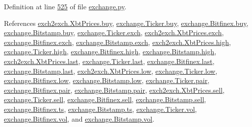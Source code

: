 Definition at line \hyperlink{exchange_8py_source_l00525}{525} of file \hyperlink{exchange_8py_source}{exchange.\+py}.



References \hyperlink{exch2exch_8py_source_l00059}{exch2exch.\+Xbt\+Prices.\+buy}, \hyperlink{exchange_8py_source_l00060}{exchange.\+Ticker.\+buy}, \hyperlink{exchange_8py_source_l00430}{exchange.\+Bitfinex.\+buy}, \hyperlink{exchange_8py_source_l00502}{exchange.\+Bitstamp.\+buy}, \hyperlink{exchange_8py_source_l00057}{exchange.\+Ticker.\+exch}, \hyperlink{exch2exch_8py_source_l00064}{exch2exch.\+Xbt\+Prices.\+exch}, \hyperlink{exchange_8py_source_l00424}{exchange.\+Bitfinex.\+exch}, \hyperlink{exchange_8py_source_l00499}{exchange.\+Bitstamp.\+exch}, \hyperlink{exch2exch_8py_source_l00061}{exch2exch.\+Xbt\+Prices.\+high}, \hyperlink{exchange_8py_source_l00062}{exchange.\+Ticker.\+high}, \hyperlink{exchange_8py_source_l00432}{exchange.\+Bitfinex.\+high}, \hyperlink{exchange_8py_source_l00504}{exchange.\+Bitstamp.\+high}, \hyperlink{exch2exch_8py_source_l00063}{exch2exch.\+Xbt\+Prices.\+last}, \hyperlink{exchange_8py_source_l00064}{exchange.\+Ticker.\+last}, \hyperlink{exchange_8py_source_l00434}{exchange.\+Bitfinex.\+last}, \hyperlink{exchange_8py_source_l00506}{exchange.\+Bitstamp.\+last}, \hyperlink{exch2exch_8py_source_l00062}{exch2exch.\+Xbt\+Prices.\+low}, \hyperlink{exchange_8py_source_l00063}{exchange.\+Ticker.\+low}, \hyperlink{exchange_8py_source_l00433}{exchange.\+Bitfinex.\+low}, \hyperlink{exchange_8py_source_l00505}{exchange.\+Bitstamp.\+low}, \hyperlink{exchange_8py_source_l00058}{exchange.\+Ticker.\+pair}, \hyperlink{exchange_8py_source_l00425}{exchange.\+Bitfinex.\+pair}, \hyperlink{exchange_8py_source_l00500}{exchange.\+Bitstamp.\+pair}, \hyperlink{exch2exch_8py_source_l00058}{exch2exch.\+Xbt\+Prices.\+sell}, \hyperlink{exchange_8py_source_l00061}{exchange.\+Ticker.\+sell}, \hyperlink{exchange_8py_source_l00431}{exchange.\+Bitfinex.\+sell}, \hyperlink{exchange_8py_source_l00503}{exchange.\+Bitstamp.\+sell}, \hyperlink{exchange_8py_source_l00428}{exchange.\+Bitfinex.\+ts}, \hyperlink{exchange_8py_source_l00501}{exchange.\+Bitstamp.\+ts}, \hyperlink{exchange_8py_source_l00065}{exchange.\+Ticker.\+vol}, \hyperlink{exchange_8py_source_l00435}{exchange.\+Bitfinex.\+vol}, and \hyperlink{exchange_8py_source_l00507}{exchange.\+Bitstamp.\+vol}.


